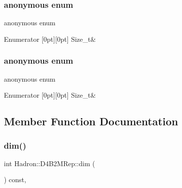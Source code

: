 \subsubsection{\texorpdfstring{anonymous enum}{anonymous enum}}
{\footnotesize\ttfamily anonymous enum}

\begin{DoxyEnumFields}{Enumerator}
[0pt][0pt]{}\mbox{\label{structHadron_1_1D4B2MRep_a9a8040cbc17fdc7ca2fb2dba128dc60ead8c661df2ab9ecdd98d3168081884dd3}} 
Size\+\_\+t&\\
\hline

\end{DoxyEnumFields}
\mbox{\label{structHadron_1_1D4B2MRep_a9a8040cbc17fdc7ca2fb2dba128dc60e}} 
\subsubsection{\texorpdfstring{anonymous enum}{anonymous enum}}
{\footnotesize\ttfamily anonymous enum}

\begin{DoxyEnumFields}{Enumerator}
[0pt][0pt]{}\mbox{\label{structHadron_1_1D4B2MRep_a9a8040cbc17fdc7ca2fb2dba128dc60ead8c661df2ab9ecdd98d3168081884dd3}} 
Size\+\_\+t&\\
\hline

\end{DoxyEnumFields}


\subsection{Member Function Documentation}
\mbox{\label{structHadron_1_1D4B2MRep_ac21548568caf31696cb786877246f6a3}} 
\subsubsection{\texorpdfstring{dim()}{dim()}\hspace{0.1cm}{\footnotesize\ttfamily [1/2]}}
{\footnotesize\ttfamily int Hadron\+::\+D4\+B2\+M\+Rep\+::dim (\begin{DoxyParamCaption}{ }\end{DoxyParamCaption}) const\hspace{0.3cm}{\ttfamily [inline]}, {\ttfamily [virtual]}}

